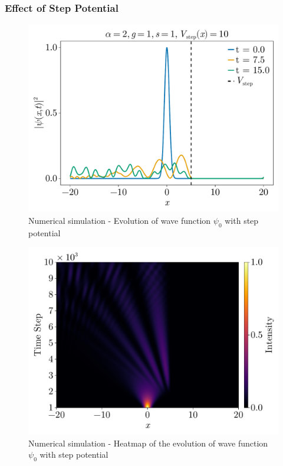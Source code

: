 \documentclass[8pt, a4paper, twocolumn]{article}
\begin{document}
\subsubsection{Effect of Step Potential}
\begin{figure}[h!]
	\vspace{-3.5ex}
	\centering
	\includegraphics[width=\linewidth]{../figs/nlse_evolution_step.pdf}
	\caption{Numerical simulation - Evolution of wave function $\psi_0$ with step potential}
	\label{fig:nlse_evolution_step}
\end{figure}
\begin{figure}[h!]
	\vspace{-3.5ex}
	\centering
	\includegraphics[width=\linewidth]{../figs/nlse_heatmap_step.pdf}
	\caption{Numerical simulation - Heatmap of the evolution of wave function $\psi_0$ with step potential}
	\label{fig:nlse_heatmap_step}
\end{figure}
\end{document}
